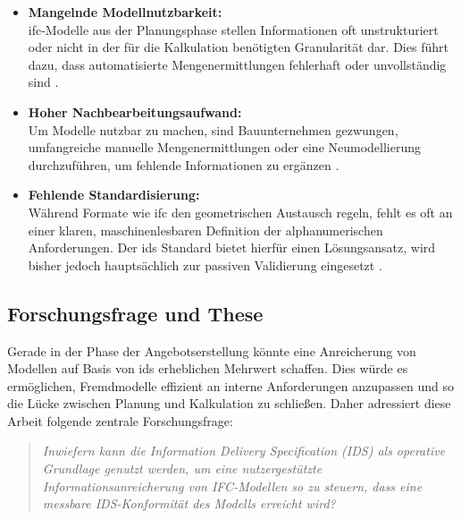 \begin{itemize}
    \item \textbf{Mangelnde Modellnutzbarkeit:} \\
    \gls{ifc}-Modelle aus der Planungsphase stellen Informationen oft unstrukturiert oder 
    nicht in der für die Kalkulation benötigten Granularität dar. Dies führt dazu, dass 
    automatisierte Mengenermittlungen fehlerhaft oder unvollständig sind 
    \cite{sacks2018bim, borrmann2015building}.
    \item \textbf{Hoher Nachbearbeitungsaufwand:} \\
    Um Modelle nutzbar zu machen, sind Bauunternehmen gezwungen, umfangreiche manuelle 
    Mengenermittlungen oder eine Neumodellierung durchzuführen, um fehlende Informationen 
    zu ergänzen \cite{amer20235d, nawab2024optimierung}.
    \item \textbf{Fehlende Standardisierung:} \\
    Während Formate wie \gls{ifc} den geometrischen Austausch regeln, fehlt es oft an einer 
    klaren, maschinenlesbaren Definition der alphanumerischen Anforderungen. Der \gls{ids} 
    Standard bietet hierfür einen Lösungsansatz, wird bisher jedoch hauptsächlich zur passiven 
    Validierung eingesetzt \cite{eichler2024bimcert,kladz2025ids,buildingsmartIds}. 
\end{itemize}

\newpage

\subsection{Forschungsfrage und These}

Gerade in der Phase der Angebotserstellung könnte eine Anreicherung von Modellen auf Basis von \gls{ids} 
erheblichen Mehrwert schaffen. Dies würde es ermöglichen, Fremdmodelle effizient an interne 
Anforderungen anzupassen und so die Lücke zwischen Planung und Kalkulation zu schließen. 
Daher adressiert diese Arbeit folgende zentrale Forschungsfrage:

\begin{quote}
    \textit{Inwiefern kann die Information Delivery Specification (IDS) als 
    operative Grundlage genutzt werden, um eine nutzergestützte Informationsanreicherung von IFC-Modellen 
    so zu steuern, dass eine messbare IDS-Konformität des Modells erreicht wird?}
\end{quote}

